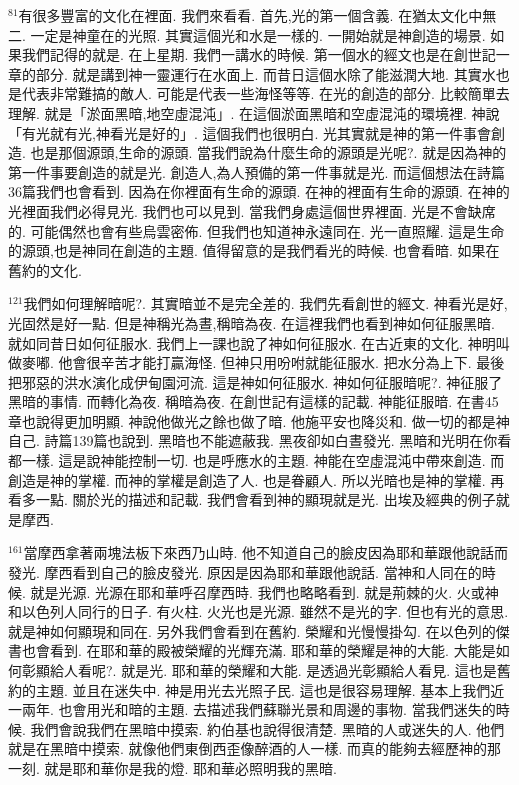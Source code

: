 \documentclass{book}
\begin{document}
$^{81}$有很多豐富的文化在裡面.
我們來看看.
首先,光的第一個含義.
在猶太文化中無二.
一定是神童在的光照.
其實這個光和水是一樣的.
一開始就是神創造的場景.
如果我們記得的就是.
在上星期.
我們一講水的時候.
第一個水的經文也是在創世記一章的部分.
就是講到神一靈運行在水面上.
而昔日這個水除了能滋潤大地.
其實水也是代表非常難搞的敵人.
可能是代表一些海怪等等.
在光的創造的部分.
比較簡單去理解.
就是「淤面黑暗,地空虛混沌」.
在這個淤面黑暗和空虛混沌的環境裡.
神說「有光就有光,神看光是好的」.
這個我們也很明白.
光其實就是神的第一件事會創造.
也是那個源頭,生命的源頭.
當我們說為什麼生命的源頭是光呢?.
就是因為神的第一件事要創造的就是光.
創造人,為人預備的第一件事就是光.
而這個想法在詩篇36篇我們也會看到.
因為在你裡面有生命的源頭.
在神的裡面有生命的源頭.
在神的光裡面我們必得見光.
我們也可以見到.
當我們身處這個世界裡面.
光是不會缺席的.
可能偶然也會有些烏雲密佈.
但我們也知道神永遠同在.
光一直照耀.
這是生命的源頭,也是神同在創造的主題.
值得留意的是我們看光的時候.
也會看暗.
如果在舊約的文化.

$^{121}$我們如何理解暗呢?.
其實暗並不是完全差的.
我們先看創世的經文.
神看光是好,光固然是好一點.
但是神稱光為晝,稱暗為夜.
在這裡我們也看到神如何征服黑暗.
就如同昔日如何征服水.
我們上一課也說了神如何征服水.
在古近東的文化.
神明叫做麥嘟.
他會很辛苦才能打贏海怪.
但神只用吩咐就能征服水.
把水分為上下.
最後把邪惡的洪水演化成伊甸園河流.
這是神如何征服水.
神如何征服暗呢?.
神征服了黑暗的事情.
而轉化為夜.
稱暗為夜.
在創世記有這樣的記載.
神能征服暗.
在書45章也說得更加明顯.
神說他做光之餘也做了暗.
他施平安也降災和.
做一切的都是神自己.
詩篇139篇也說到.
黑暗也不能遮蔽我.
黑夜卻如白晝發光.
黑暗和光明在你看都一樣.
這是說神能控制一切.
也是呼應水的主題.
神能在空虛混沌中帶來創造.
而創造是神的掌權.
而神的掌權是創造了人.
也是眷顧人.
所以光暗也是神的掌權.
再看多一點.
關於光的描述和記載.
我們會看到神的顯現就是光.
出埃及經典的例子就是摩西.

$^{161}$當摩西拿著兩塊法板下來西乃山時.
他不知道自己的臉皮因為耶和華跟他說話而發光.
摩西看到自己的臉皮發光.
原因是因為耶和華跟他說話.
當神和人同在的時候.
就是光源.
光源在耶和華呼召摩西時.
我們也略略看到.
就是荊棘的火.
火或神和以色列人同行的日子.
有火柱.
火光也是光源.
雖然不是光的字.
但也有光的意思.
就是神如何顯現和同在.
另外我們會看到在舊約.
榮耀和光慢慢掛勾.
在以色列的傑書也會看到.
在耶和華的殿被榮耀的光輝充滿.
耶和華的榮耀是神的大能.
大能是如何彰顯給人看呢?.
就是光.
耶和華的榮耀和大能.
是透過光彰顯給人看見.
這也是舊約的主題.
並且在迷失中.
神是用光去光照子民.
這也是很容易理解.
基本上我們近一兩年.
也會用光和暗的主題.
去描述我們蘇聯光景和周邊的事物.
當我們迷失的時候.
我們會說我們在黑暗中摸索.
約伯基也說得很清楚.
黑暗的人或迷失的人.
他們就是在黑暗中摸索.
就像他們東倒西歪像醉酒的人一樣.
而真的能夠去經歷神的那一刻.
就是耶和華你是我的燈.
耶和華必照明我的黑暗.
\end{document}
